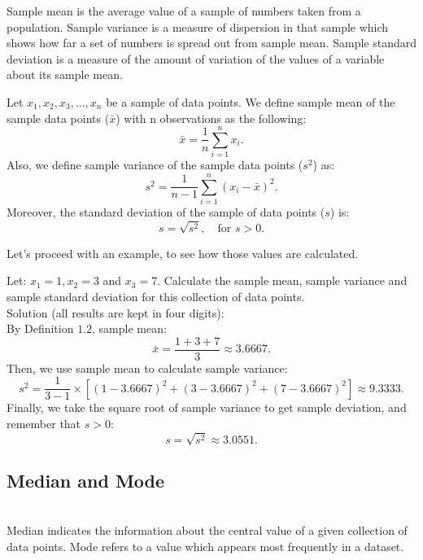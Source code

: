 \noindent
Sample mean is the average value of a sample of numbers taken from a population. Sample variance is a measure of dispersion in that sample which shows how far a set of numbers is spread out from sample mean. Sample standard deviation is a measure of the amount of variation of the values of a variable about its sample mean.

\begin{definition}
	Let $x_1, x_2, x_3, ..., x_n$ be a sample of data points. We define sample mean of the sample data points ($\bar{x}$) with n observations as the following: 
	$$ \bar{x} = \frac{1}{n} \sum_{i=1}^{n} x_i. $$
	Also, we define sample variance of the sample data points ($s^2$) as: \[ s^2 = \frac{1}{n-1} \sum_{i=1}^{n}(x_i - \bar{x})^2.\] Moreover, the standard deviation of the sample of data points ($s$) is: \[ s = \sqrt{s^2}, \quad \text{for } s > 0.\]
\end{definition}

Let's proceed with an example, to see how those values are calculated.

\begin{example}
Let: $x_1 = 1, x_2 = 3$ and $x_3 = 7$. Calculate the sample mean, sample variance and sample standard deviation for this collection of data points.\\

Solution (all results are kept in four digits):\\
\noindent
By Definition $1.2$, sample mean: \[ \bar{x} = \frac{1+3+7}{3} \approx 3.6667.\]
Then, we use sample mean to calculate sample variance: \[ s^2 = \frac{1}{3-1} \times [(1-3.6667)^2+(3-3.6667)^2+(7-3.6667)^2] \approx 9.3333.\]
Finally, we take the square root of sample variance to get sample deviation, and remember that $s > 0$: \[ s = \sqrt{s^2} \approx 3.0551.\]
\end{example}

\subsection{Median and Mode}\\

\noindent
Median indicates the information about the central value of a given collection of data points. Mode refers to a value which appears most frequently in a dataset.\\

